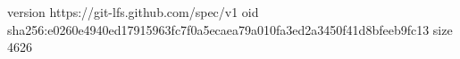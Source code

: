 version https://git-lfs.github.com/spec/v1
oid sha256:e0260e4940ed17915963fc7f0a5ecaea79a010fa3ed2a3450f41d8bfeeb9fc13
size 4626
